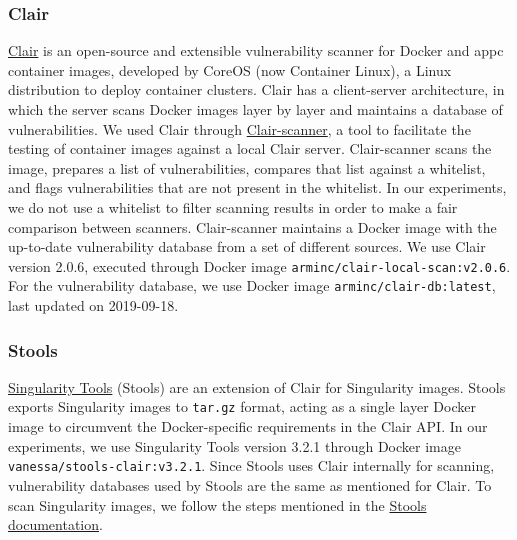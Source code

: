 \subsubsection{Clair}

\href{https://github.com/quay/clair}{Clair} is an open-source and
extensible vulnerability scanner for Docker and appc container images,
developed by CoreOS (now Container Linux), a Linux distribution to deploy
container clusters.
Clair has a client-server architecture, in which the
server scans Docker images layer by layer and maintains a database of
vulnerabilities.
We used Clair through
\href{https://github.com/arminc/clair-scanner}{Clair-scanner}, a tool to
facilitate the testing of container images against a local Clair server.
Clair-scanner scans the image,
prepares a list of vulnerabilities, compares that list against a
whitelist, and flags vulnerabilities that are not present in the whitelist.
In our experiments, we do not use a whitelist to filter scanning results in
order to make a fair comparison between scanners.
Clair-scanner maintains a Docker image with the up-to-date vulnerability
database from a set of different sources.
We use Clair version 2.0.6, executed through
Docker image \texttt{arminc/clair-local-scan:v2.0.6}. For the vulnerability
database, we use Docker image \texttt{arminc/clair-db:latest}, last
updated on 2019-09-18.

\subsubsection{Stools}
\href{https://github.com/singularityhub/stools}{Singularity Tools} (Stools)
are an extension of Clair for Singularity images. Stools
exports Singularity images to \texttt{tar.gz} format, acting as a single layer Docker image
to circumvent the Docker-specific requirements in the Clair API.
In our experiments, we use Singularity Tools version 3.2.1 through Docker
image
\texttt{vanessa/stools-clair:v3.2.1}.
Since Stools uses Clair internally for scanning, vulnerability databases used
by Stools are the same as mentioned for Clair.
To scan Singularity images, we follow the steps mentioned in the
\href{https://github.com/singularityhub/stools}{Stools documentation}.


